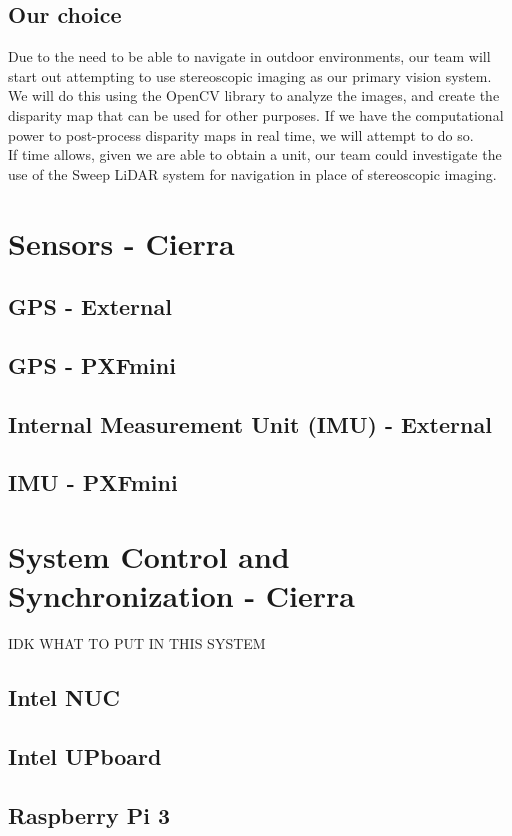 \documentclass[compsoc,draftclsnofoot,onecolumn,10pt]{IEEEtran}
\begin{document}
\subsection{Our choice}
Due to the need to be able to navigate in outdoor environments, our team will start out attempting to use stereoscopic imaging as our primary vision system. We will do this using the OpenCV library to analyze the images, and create the disparity map that can be used for other purposes. If we have the computational power to post-process disparity maps in real time, we will attempt to do so. \\
If time allows, given we are able to obtain a unit, our team could investigate the use of the Sweep LiDAR system for navigation in place of stereoscopic imaging. 

\section{Sensors - Cierra}
\subsection{GPS - External}
\subsection{GPS - PXFmini}
\subsection{Internal Measurement Unit (IMU) - External}
\subsection{IMU - PXFmini}


\section{System Control and Synchronization - Cierra}
IDK WHAT TO PUT IN THIS SYSTEM
\subsection{Intel NUC}

\subsection{Intel UPboard}

\subsection{Raspberry Pi 3}
\end{document}
